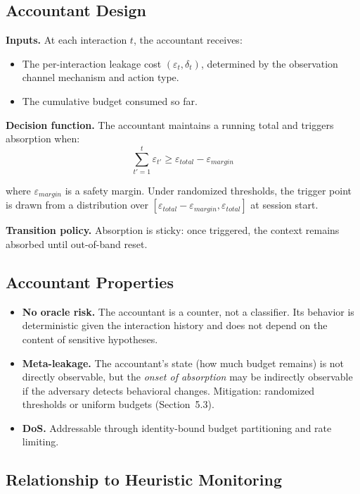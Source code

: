 \documentclass[11pt,a4paper]{article}
\begin{document}
\subsection{Accountant Design}

\textbf{Inputs.} At each interaction $t$, the accountant receives:
\begin{itemize}
  \item The per-interaction leakage cost $(\varepsilon_t, \delta_t)$, determined by the observation channel mechanism and action type.
  \item The cumulative budget consumed so far.
\end{itemize}

\textbf{Decision function.} The accountant maintains a running total and triggers absorption when:
\begin{equation}
\sum_{t'=1}^{t} \varepsilon_{t'} \ge \varepsilon_{total} - \varepsilon_{margin}
\end{equation}

where $\varepsilon_{margin}$ is a safety margin. Under randomized thresholds, the trigger point is drawn from a distribution over $[\varepsilon_{total} - \varepsilon_{margin}, \varepsilon_{total}]$ at session start.

\textbf{Transition policy.} Absorption is sticky: once triggered, the context remains absorbed until out-of-band reset.

\subsection{Accountant Properties}

\begin{itemize}
  \item \textbf{No oracle risk.} The accountant is a counter, not a classifier. Its behavior is deterministic given the interaction history and does not depend on the content of sensitive hypotheses.
  \item \textbf{Meta-leakage.} The accountant's state (how much budget remains) is not directly observable, but the \textit{onset of absorption} may be indirectly observable if the adversary detects behavioral changes. Mitigation: randomized thresholds or uniform budgets (Section~5.3).
  \item \textbf{DoS.} Addressable through identity-bound budget partitioning and rate limiting.
\end{itemize}

\subsection{Relationship to Heuristic Monitoring}
\end{document}

